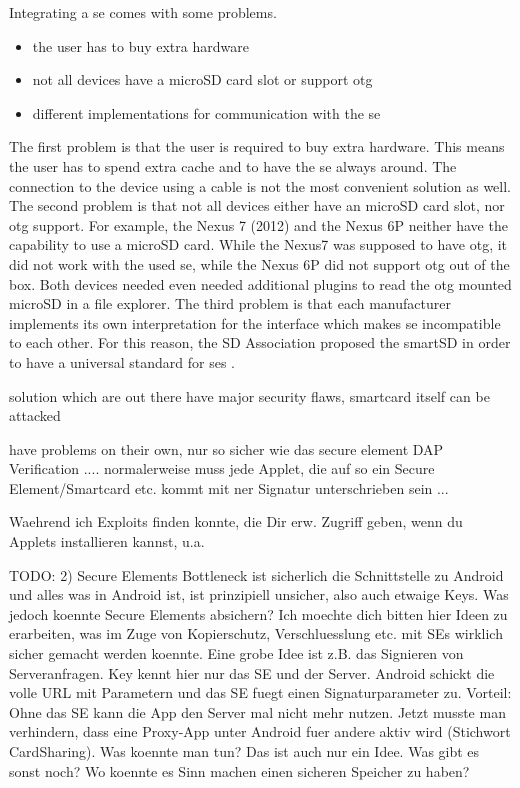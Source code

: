 Integrating a \gls{se} comes with some problems.
\begin{itemize}
  \item the user has to buy extra hardware
  \item not all devices have a microSD card slot or support \gls{otg}
  \item different implementations for communication with the \gls{se}
\end{itemize}
The first problem is that the user is required to buy extra hardware.
This means the user has to spend extra cache and to have the \gls{se} always around.
The connection to the device using a cable is not the most convenient solution as well.
The second problem is that not all devices either have an microSD card slot, nor \gls{otg} support.
For example, the Nexus 7 (2012) and the Nexus 6P neither have the capability to use a microSD card.
While the Nexus7 was supposed to have \gls{otg}, it did not work with the used \gls{se}, while the Nexus 6P did not support \gls{otg} out of the box.
Both devices needed even needed additional plugins to read the \gls{otg} mounted microSD in a file explorer.
The third problem is that each manufacturer implements its own interpretation for the interface which makes \gls{se} incompatible to each other.
For this reason, the SD Association proposed the smartSD in order to have a universal standard for \gls{se}s \cite{smartSD}.
\newline


solution which are out there have major security flaws, smartcard itself can be attacked

have problems on their own, nur so sicher wie das secure element
DAP Verification .... normalerweise muss jede Applet, die auf so ein Secure Element/Smartcard etc. kommt mit ner Signatur unterschrieben sein ...


Waehrend ich Exploits finden konnte, die Dir erw. Zugriff geben, wenn du Applets installieren kannst, u.a.





TODO:
2) Secure Elements
Bottleneck ist sicherlich die Schnittstelle zu Android und alles was in Android ist, ist prinzipiell unsicher, also auch etwaige Keys. Was jedoch koennte Secure Elements absichern? Ich moechte dich bitten hier Ideen zu erarbeiten, was im Zuge von Kopierschutz,  Verschluesslung etc. mit SEs wirklich sicher gemacht werden koennte. Eine grobe Idee ist z.B. das Signieren von Serveranfragen. Key kennt hier nur das SE und der Server. Android schickt die volle URL mit Parametern und das SE fuegt einen Signaturparameter zu. Vorteil: Ohne das SE kann die App den Server mal nicht mehr nutzen. Jetzt musste man verhindern, dass eine Proxy-App unter Android fuer andere aktiv wird (Stichwort CardSharing). Was koennte man tun? Das ist auch nur ein Idee. Was gibt es sonst noch? Wo koennte es Sinn machen einen sicheren Speicher zu haben?
